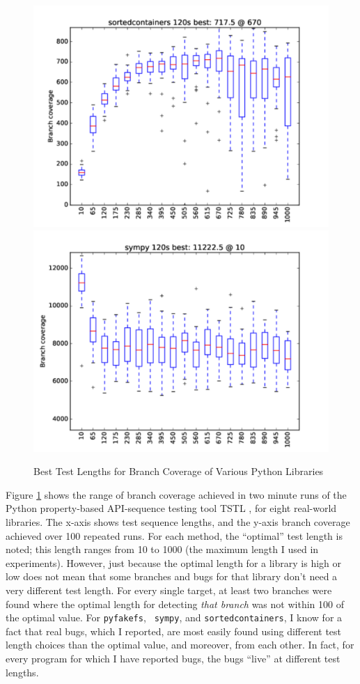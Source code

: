 \documentclass[sigplan,screen]{acmart}
\begin{document}
\begin{figure}
\includegraphics[width=0.9\columnwidth]{graphs/sortedcontainersrand120}
\includegraphics[width=0.9\columnwidth]{graphs/sympyrand120}
\caption{Best Test Lengths for Branch Coverage of Various Python
  Libraries}
\label{fig:length}

\end{figure}

Figure \ref{fig:length} shows the range of branch coverage achieved in
two minute runs of the Python property-based API-sequence testing tool
TSTL \cite{tstlsttt}, for
eight real-world libraries.  The x-axis shows test sequence lengths,
and the y-axis branch coverage achieved over 100 repeated runs.  For
each method, the ``optimal'' test length is noted; this length ranges
from 10 to 1000 (the maximum length I used in experiments).  However,
just because the optimal length for a library is high or low does not
mean that some branches and bugs for that library don't need a very
different test length.  For every single target, at least two branches
were found where the optimal length for detecting \emph{that branch}
was not within 100 of the optimal value.  For {\tt pyfakefs}, {\tt
  sympy}, and {\tt sortedcontainers}, I know for a fact that real
bugs, which I reported, are most easily found using different test
length choices than the optimal value, and moreover, from each other.
In fact, for every program for which I have reported bugs, the bugs
``live'' at different test lengths.
\end{document}

